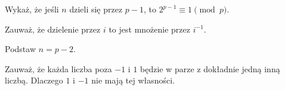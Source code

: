 
\begin{hints_list}
	\item Wykaż, że jeśli $n$ dzieli się przez $p - 1$, to $2^{p - 1} \equiv 1 \pmod{p}$. 
	\item Zauważ, że dzielenie przez $i$ to jest mnożenie przez $i^{-1}$.
	\item Podstaw $n = p - 2$.
	\item Zauważ, że każda liczba poza $-1$ i $1$ będzie w parze z dokładnie jedną inną liczbą. Dlaczego $1$ i $-1$ nie mają tej własności.
\end{hints_list}